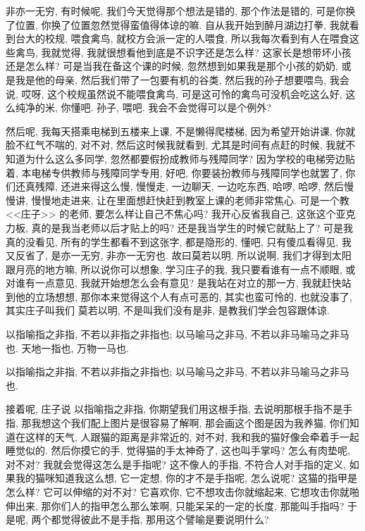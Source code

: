 \documentclass[11pt]{article}
\begin{document}
{\color{blue} 非亦一无穷}, 有时候呢, 我们今天觉得那个想法是错的, 那个作法是错的, 可是你换了位置, 你换了位置忽然觉得蛮值得体谅的嘛. 自从我开始到醉月湖边打拳, 我就看到台大的校规, 喂食禽鸟, 就校方会派一定的人喂食, 所以我每次看到有人在喂食这些禽鸟, 我就觉得, 我就很想看他到底是不识字还是怎么样? 这家长是想带坏小孩还是怎么样? 可是当我在备这个课的时候, 忽然想到如果我是那个小孩的奶奶, 或是我是他的母亲, 然后我们带了一包要有机的谷类, 然后我的孙子想要喂鸟, 我会说, 哎呀, 这个校规虽然说不能喂食禽鸟, 可是这可怜的禽鸟可没机会吃这么好, 这么纯净的米, 你懂吧. 孙子, 喂吧. 我会不会觉得可以是个例外?

然后呢, 我每天搭乘电梯到五楼来上课, 不是懒得爬楼梯, 因为希望开始讲课, 你就脸不红气不喘的, 对不对, 然后这时候我就看到, 尤其是时间有点赶的时候, 我就不知道为什么这么多同学, 忽然都要假扮成教师与残障同学? 因为学校的电梯旁边贴着, 本电梯专供教师与残障同学专用, 好吧, 你要装扮教师与残障同学也就罢了, 你们还真残障, 还进来得这么慢, 慢慢走, 一边聊天, 一边吃东西, 哈啰, 哈啰, 然后慢慢讲, 慢慢地走进来, 让在里面想赶快赶到教室上课的老师非常焦心. 可是一个教 <<庄子>> 的老师, 要怎么样让自己不焦心吗? 我开心反省我自己, 这张这个亚克力板, 真的是我当老师以后才贴上的吗? 还是我当学生的时候它就贴上了? 可是我真的没看见, 所有的学生都看不到这张字, 都是隐形的, 懂吧, 只有傻瓜看得见, 我又反省了, {\color{blue} 是亦一无穷, 非亦一无穷也. 故曰莫若以明}. 所以说啊, 我们才得到太阳跟月亮的地方嘛, 所以说你可以想象, 学习庄子的我, 我只要看谁有一点不顺眼, 或对谁有一点意见, 我就开始想怎么会有意见? 是我站在对立的那一方, 我就赶快站到他的立场想想, 那你本来觉得这个人有点可恶的, 其实也蛮可怜的, 也就没事了, 其实庄子叫我们{\color{blue} 莫若以明}, 不是叫我们没有是非, 是教我们学会包容跟体谅.


{\color{blue} 以指喻指之非指, 不若以非指之非指也; 以马喻马之非马, 不若以非马喻马之非马也. 天地一指也, 万物一马也.}

\begin{center}
	{\color{green} 以指喻指之非指, 不若以非指之非指也; 以马喻马之非马, 不若以非马喻马之非马也. }
\end{center}

\vspace{-0.5cm}

接着呢, 庄子说{\color{blue} 以指喻指之非指}, 你期望我们用这根手指, 去说明那根手指不是手指, 那我想这个我们配上图片是很容易了解啊, 那会画这个图是因为我养猫, 你们知道在这样的天气, 人跟猫的距离是非常近的, 对不对, 我和我的猫好像会牵着手一起睡觉似的. 然后你摸它的手, 觉得猫的手太神奇了, 这也叫手掌吗? 怎么有肉垫呢, 对不对? 我就会觉得这怎么是手指呢? 这不像人的手指, 不符合人对手指的定义, 如果我的猫咪知道我这么想, 它一定想, 你的才不是手指呢, 怎么说呢? 这猫的指甲是怎么样? 它可以伸缩的对不对? 它喜欢你, 它不想攻击你就缩起来, 它想攻击你就啪伸出来, 那你们人的指甲怎么那么笨啊, 只能呆呆的一定的长度, 那能叫手指吗? 于是呢, 两个都觉得彼此不是手指, 那用这个譬喻是要说明什么?
\end{document}
